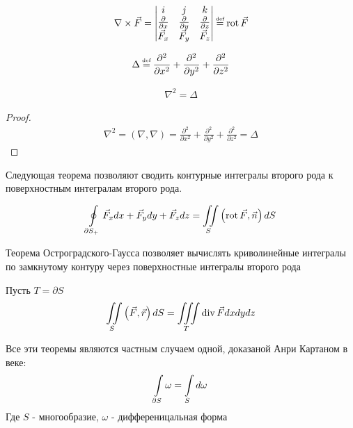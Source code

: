 \begin{definition}
	\begin{gather*}
		\nabla \times \vec{F} = 
		\begin{vmatrix}
			i & j & k \\
			\pdiff{}{x} & \pdiff{}{y} & \pdiff{}{z} \\
			\vec{F}_x & \vec{F}_y & \vec{F}_z \notag
		\end{vmatrix}
		\defeq \rot \vec{F}
	\end{gather*}
\end{definition}

\begin{definition}
	\begin{gather*}
	\Delta \defeq 
		 \frac{\partial^2}{\partial x^2} +
		 \frac{\partial^2}{\partial y^2} + 
		 \frac{\partial^2}{\partial z^2}
	\end{gather*}
\end{definition}

\begin{theorem}[О треугольниках]
	\begin{gather*}
		\nabla^2 = \Delta
	\end{gather*}
\end{theorem}

\begin{proof}
	\begin{gather*}
		\nabla^2 = \left( \nabla , \nabla \right) = 
		\frac{\partial^2}{\partial x^2} +
		\frac{\partial^2}{\partial y^2} + 
		\frac{\partial^2}{\partial z^2}
		= \Delta
	\end{gather*}
\end{proof}

Следующая теорема позволяют сводить контурные интегралы второго рода к 
поверхностным интегралам второго рода.

\begin{theorem}
	\begin{gather*}
		\oint\limits_{\partial S_{+}} \vec{F}_x dx + \vec{F}_y dy + \vec{F}_z dz =
		\iint\limits_{S} \left( \operatorname{rot} \vec{F}, \vec{n}\right)dS
	\end{gather*}
\end{theorem}
Теорема Остроградского-Гаусса позволяет вычислять криволинейные интегралы 
по замкнутому контуру через поверхностные интегралы второго рода
\begin{theorem}
	Пусть $T = \partial S$
	\begin{gather*}
		\iint\limits_{S} \left( \vec{F}, \vec{r}\right)dS = 
		\iiint\limits_{T} \operatorname{div} \vec{F} dxdydz
	\end{gather*}
\end{theorem}

\begin{nb}
	Все эти теоремы являются частным случаем одной, доказаной Анри Картаном в 
	 веке:
	\begin{gather*}
		\int\limits_{\partial S} \omega = \int\limits_{S} d\omega
	\end{gather*}
	Где $S$ - многообразие, $\omega$ - дифференицальная форма
\end{nb}
